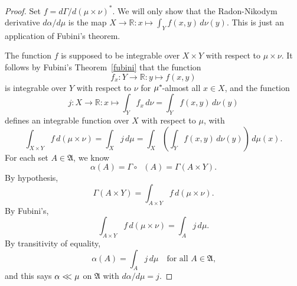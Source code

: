 \documentclass[
twoside=true,
paper=letter,
fontsize=9pt,
pagesize=auto,
leqno,
openany,
headsepline,
overfullrule,
]{scrbook}
\theoremstyle{plain}
\theoremstyle{plain}
\theoremstyle{definition}
\theoremstyle{bfnoteitalic}
\theoremstyle{bfnoteroman}
\newcommand{\sigalg}[1]{\mathfrak{#1}}
\newcommand{\preimage}[1]{\mathop{#1^{\leftarrow}}}
\newcommand{\R}{\mathbb{R}}
\newcommand{\sigmaalgebra}{\sigalg{A}}
\newcommand{\kernast}{\ast\kern-1pt}
\newcommand{\funcj}{j}
\newcommand{\function}{f}
\newcommand{\measurespace}{X}
\newcommand{\measurespaceii}{Y}
\newcommand{\mspaceelt}{x}
\newcommand{\mspaceeltii}{y}
\newcommand{\abscont}{\mathrel{< \kern-3.5pt <}}
\newcommand{\measure}{\mu}
\newcommand{\measureii}{\nu}
\newcommand{\seti}{A}
\newcommand{\projectionone}{\pi_1}
\newcommand{\pspace}{\measurespace}%
\newcommand{\sspace}{\measurespaceii}%
\newcommand{\measonprod}{\Gamma}%
\newcommand{\marginalone}{\alpha}%
\begin{document}
\begin{proof}
Set
$\function = d\measonprod / d(\measure\times\measureii)^*$.
We will only show that the Radon-Nikodym derivative
$d \marginalone / d \measure$
is the map
$\measurespace\to\R:
\mspaceelt\mapsto
\int_{\measurespaceii}\function(\mspaceelt,\mspaceeltii)\,d\measureii(\mspaceeltii)$.
This is just an application of Fubini's theorem.

The function $\function$ is supposed to be integrable over $\pspace\times\sspace$ with respect to 
$\measure\times\measureii$. It follows by
Fubini's Theorem~\ref{fubini} that
the function
\[
\function_\mspaceelt : 
\measurespaceii \to\R
: \mspaceeltii \mapsto \function(\mspaceelt,\mspaceeltii)
\]
is integrable over $\measurespaceii$ with respect to $\measureii$
 for
$\measure^\kernast$-almost all 
$\mspaceelt\in\measurespace$, 
and the function
\[
\funcj :\measurespace\to\R :\mspaceelt\mapsto
\int_\measurespaceii\function_\mspaceelt\,d\measureii
=
\int_{\measurespaceii}\function(\mspaceelt,\mspaceeltii) \, d\measureii(\mspaceeltii)
\]
defines an integrable function over $\measurespace$ with respect to 
$\measure$, with
\[
\int_{\measurespace\times\measurespaceii} 
\function \, d (\measure\times\measureii)
=
\int_\measurespace \funcj \,d \measure
=
\int_\measurespace
\left(
\int_\measurespaceii
\function(\mspaceelt,\mspaceeltii) 
\, d\measureii(\mspaceeltii)
\right) \, d\measure(\mspaceelt).
\]
For each set $\seti\in\sigmaalgebra$,
we know 
\[
\marginalone(\seti) 
= \measonprod\circ\preimage{\projectionone}(\seti)
= \measonprod(\seti\times\measurespaceii).
\]
By hypothesis, 
\[
\measonprod(\seti\times\measurespaceii)
=
\int_{\seti\times\measurespaceii} \function \, d(\measure\times\measureii).
\]
By Fubini's,
\[
\int_{\seti\times\measurespaceii} \function 
\, d(\measure\times\measureii)
= \int_{\seti} \funcj \,d\measure.
\]
By transitivity of equality, 
\[
\marginalone(\seti)
=
\int_{\seti} \funcj \,d\measure
\quad
\text{for all $\seti\in\sigmaalgebra$,}
\]
and this says $\marginalone\abscont \measure$
on $\sigmaalgebra$ with
$d\marginalone/d\measure = \funcj$.
\end{proof}
\end{document}
